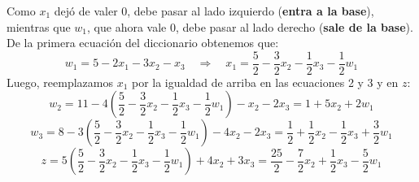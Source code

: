 \documentclass[10pt, aspectratio=169]{beamer}
\begin{document}
    \begin{frame}{}
        \small

        Como $x_1$ dejó de valer $0$, debe pasar al lado izquierdo (\textbf{entra a la base}),
        mientras que $w_1$, que ahora vale $0$, debe pasar al lado derecho (\textbf{sale de la base}).
        De la primera ecuación del diccionario obtenemos que:
        \[ w_1  =  5 - 2x_1 - 3x_2 - x_3 \quad \Rightarrow \quad x_1 = \frac{5}{2} - \frac{3}{2}x_2 -\frac{1}{2}x_3 -
        \frac{1}{2} w_1  \]
        Luego, reemplazamos $x_1$ por la igualdad de arriba en las ecuaciones 2 y 3 y en $z$:
        \[ w_2 = 11 - 4\left(\frac{5}{2} - \frac{3}{2}x_2 -\frac{1}{2}x_3 -\frac{1}{2} w_1 \right)
        - x_2 - 2x_3 = 1+5x_2+2w_1  \]
        \[w_3 = 8 - 3\left(\frac{5}{2} - \frac{3}{2}x_2 -\frac{1}{2}x_3 -\frac{1}{2} w_1 \right) - 4x_2 - 2x_3 =
        \frac{1}{2}+\frac{1}{2}x_2-\frac{1}{2}x_3+\frac{3}{2}w_1\]
        \[z  = 5\left(\frac{5}{2} - \frac{3}{2}x_2 -\frac{1}{2}x_3 -\frac{1}{2} w_1\right) + 4x_2 + 3x_3 = \frac{25}{2}-
        \frac{7}{2}x_2+\frac{1}{2}x_3-\frac{5}{2}w_1 \]

    \end{frame}
\end{document}

